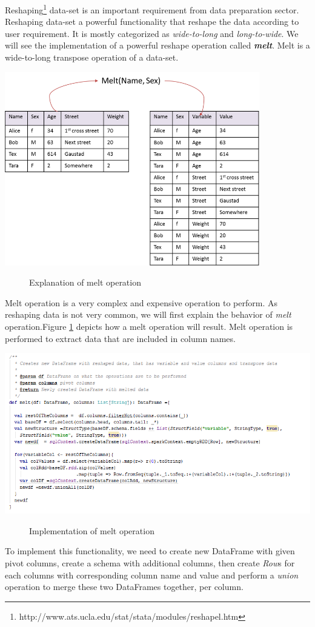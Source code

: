\begin{enumerate}
Reshaping\footnote{http://www.ats.ucla.edu/stat/stata/modules/reshapel.htm} data-set is an important requirement from data preparation sector. Reshaping data-set a powerful functionality that reshape the data according to user requirement. It is mostly categorized as \textit{wide-to-long} and \textit{long-to-wide}. We will see the implementation of a powerful reshape operation called \textit{\textbf{melt}}. Melt is a wide-to-long transpose operation of a data-set. 
\begin{center}
\includegraphics[width=30em]{./Figures/melt}
\begin{figure}[htbp]
\caption{Explanation of melt operation}
\label{fig:melt-exp}
\end{figure}
\end{center}
Melt operation is a very complex and expensive operation to perform. As reshaping data is not very common, we will first explain the behavior of \textit{melt} operation.Figure \ref{fig:melt-exp} depicts how a melt operation will result. Melt operation is performed to extract data that are included in column names. 
\begin{center}
\includegraphics[width=38em]{./Figures/melt-impl}
\begin{figure}[htbp]
\caption{Implementation of melt operation}
\label{fig:melt-impl}
\end{figure}
\end{center}
To implement this functionality, we need to create new DataFrame with given pivot columns, create a schema with additional columns, then create \textit{Row}s for each columns with corresponding column name and value and perform a \textit{union} operation to merge these two DataFrames together, per column. 
\end{enumerate}
